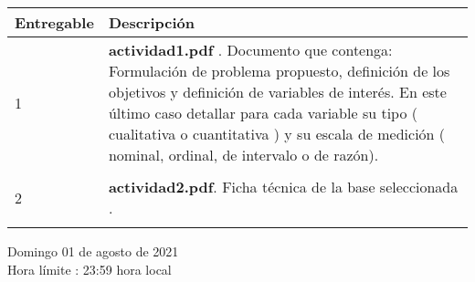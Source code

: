 \documentclass[base=hide,11pt]{elegantbook}
\begin{document}
\begin{tabular}{lp{12cm}}
{\bf Entregable } & {\bf Descripción} \\
\hline 
1& \textcolor{col3}{\bf actividad1.pdf} .\hspace{.5cm} Documento que contenga: Formulación de problema propuesto, definición  de los objetivos y definición de variables de interés. En este último caso detallar para cada variable su  tipo ( cualitativa o cuantitativa ) y su escala de medición ( nominal, ordinal, de intervalo o de razón).\\
&\\
\hline
2&  \textcolor{col3}{\bf actividad2.pdf}.\hspace{.5cm}  Ficha técnica de  la base seleccionada .\\
&\\
\hline
\end{tabular}
\vspace{1cm}

Domingo 01 de agosto de 2021\\
Hora límite : 23:59  hora  local

\end{document}
